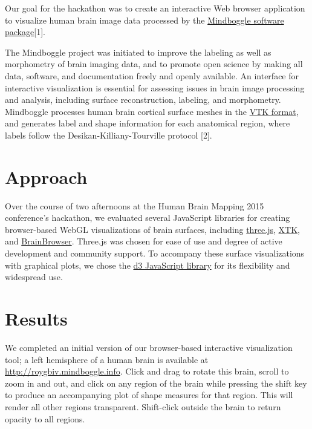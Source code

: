 \documentclass[twocolumn]{bmcart}%
\begin{document}
Our goal for the hackathon was to create an interactive Web browser
application to visualize human brain image data processed by the
\href{http://mindboggle.info/}{Mindboggle software package}{[}1{]}.

The Mindboggle project was initiated to improve the labeling as well as
morphometry of brain imaging data, and to promote open science by making
all data, software, and documentation freely and openly available. An
interface for interactive visualization is essential for assessing
issues in brain image processing and analysis, including surface
reconstruction, labeling, and morphometry. Mindboggle processes human
brain cortical surface meshes in the \href{http://www.vtk.org/}{VTK
format}, and generates label and shape information for each anatomical
region, where labels follow the Desikan-Killiany-Tourville protocol
{[}2{]}.

\section{Approach}\label{approach}

Over the course of two afternoons at the Human Brain Mapping 2015
conference's hackathon, we evaluated several JavaScript libraries for
creating browser-based WebGL visualizations of brain surfaces, including
\href{http://threejs.org/}{three.js},
\href{https://github.com/xtk/X\#readme}{XTK}, and
\href{https://brainbrowser.cbrain.mcgill.ca/}{BrainBrowser}. Three.js
was chosen for ease of use and degree of active development and
community support. To accompany these surface visualizations with
graphical plots, we chose the \href{http://d3js.org/}{d3 JavaScript
library} for its flexibility and widespread use.

\section{Results}\label{results}

We completed an initial version of our browser-based interactive
visualization tool; a left hemisphere of a human brain is available at
\url{http://roygbiv.mindboggle.info}. Click and drag to rotate this
brain, scroll to zoom in and out, and click on any region of the brain
while pressing the shift key to produce an accompanying plot of shape
measures for that region. This will render all other regions
transparent. Shift-click outside the brain to return opacity to all
regions.
\end{document}
